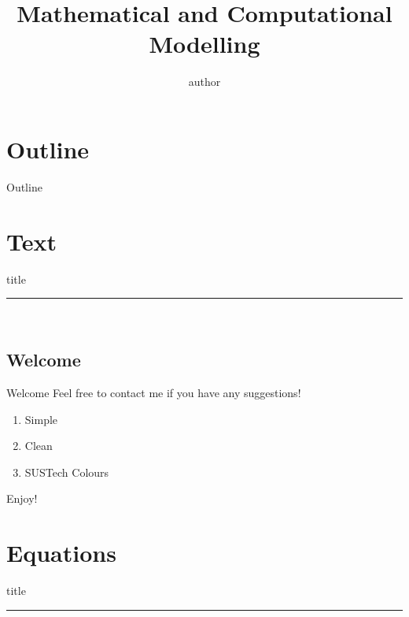 \documentclass{beamer}
\title{Mathematical and Computational Modelling}
\author{author}
\institute{Southern University of Science and Technology}
\date{} %
\begin{document}
{ 
\frame{\titlepage}}

\section*{Outline}\begin{frame}{Outline}\tableofcontents\end{frame}

\section{Text}
    \begin{frame}[plain]
        \vfill
      \centering
      \begin{beamercolorbox}[sep=8pt,center,shadow=true,rounded=true]{title}
        \insertsectionhead\par%
        \color{SUSTechDarkGreen}\noindent\rule{10cm}{1pt} \\
        \LARGE{\faFileTextO}
      \end{beamercolorbox}
      \vfill
  \end{frame}


\subsection{Welcome}
\begin{frame}{Welcome}
Feel free to contact me if you have any suggestions! \href{https://github.com/Wang-GY}{\faGithub}

\begin{enumerate}
    \item Simple
    \item Clean
    \item SUSTech Colours
\end{enumerate}
\vspace{1cm}
\begin{center}
    Enjoy! \faSmileO
\end{center}
\end{frame}


\section{Equations}
    \begin{frame}[plain]
        \vfill
      \centering
      \begin{beamercolorbox}[sep=8pt,center,shadow=true,rounded=true]{title}
        \insertsectionhead\par%
        \color{SUSTechAzure}\noindent\rule{10cm}{1pt} \\
        \LARGE{\faFileTextO}
      \end{beamercolorbox}
      \vfill
  \end{frame}
  
\end{document}

